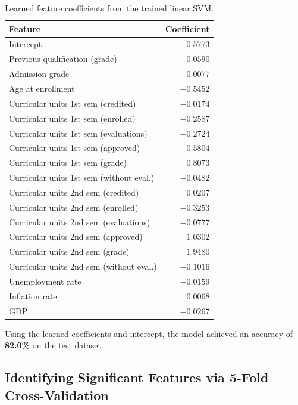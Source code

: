 \documentclass[12pt]{article}
\begin{document}
\begin{table}[H]
\centering
\begin{tabular}{@{}l r@{}}
\toprule
\textbf{Feature} & \textbf{Coefficient} \\
\midrule
Intercept                                 & $-0.5773$ \\
Previous qualification (grade)            & $-0.0590$ \\
Admission grade                           & $-0.0077$ \\
Age at enrollment                         & $-0.5452$ \\
Curricular units 1st sem (credited)       & $-0.0174$ \\
Curricular units 1st sem (enrolled)       & $-0.2587$ \\
Curricular units 1st sem (evaluations)    & $-0.2724$ \\
Curricular units 1st sem (approved)       & $ 0.5804$ \\
Curricular units 1st sem (grade)          & $ 0.8073$ \\
Curricular units 1st sem (without eval.)  & $-0.0482$ \\
Curricular units 2nd sem (credited)       & $ 0.0207$ \\
Curricular units 2nd sem (enrolled)       & $-0.3253$ \\
Curricular units 2nd sem (evaluations)    & $-0.0777$ \\
Curricular units 2nd sem (approved)       & $ 1.0302$ \\
Curricular units 2nd sem (grade)          & $ 1.9480$ \\
Curricular units 2nd sem (without eval.)  & $-0.1016$ \\
Unemployment rate                         & $-0.0159$ \\
Inflation rate                            & $ 0.0068$ \\
GDP                                       & $-0.0267$ \\
\bottomrule
\end{tabular}
\caption{Learned feature coefficients from the trained linear SVM.}
\label{tab:coeffs}
\end{table}

Using the learned coefficients and intercept, the model achieved an accuracy of \textbf{82.0\%} on the test dataset.

\subsection{Identifying Significant Features via 5-Fold Cross-Validation}
\end{document}
